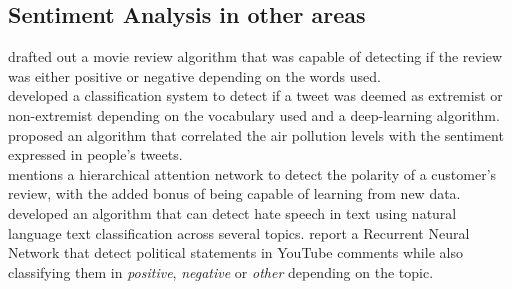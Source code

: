 \subsection{Sentiment Analysis in other areas}
\citet{rf5} drafted out a movie review algorithm that was capable of detecting if the review was either positive or negative depending on the words used.\\
\citet{rf11} developed a classification system to detect if a tweet was deemed as extremist or non-extremist depending on the vocabulary used and a deep-learning algorithm.\\
\citet{rf12} proposed an algorithm that correlated the air pollution levels with the sentiment expressed in people's tweets.\\
\citet{rf13} mentions a hierarchical attention network to detect the polarity of a customer's review, with the added bonus of being capable of learning from new data.
\citet{rf15} developed an algorithm that can detect hate speech in text using natural language text classification across several topics.
\citet{rf16} report a Recurrent Neural Network that detect political statements in YouTube comments while also classifying them in \textit{positive}, \textit{negative} or \textit{other} depending on the topic.



\clearpage